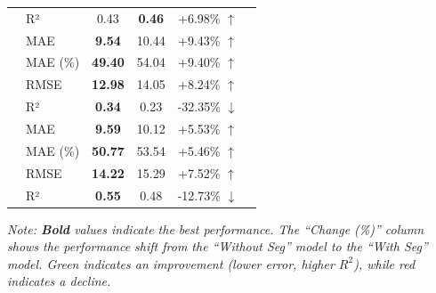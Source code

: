 \documentclass[a4paper]{article}
\begin{document}
\begin{table}[H]
\begin{lrbox}{\mycomparisonboxtable}
\begin{tabular}{@{}llcccc@{}}
            & R²        & 0.43   & \textbf{0.46}   & \textcolor{goodgreen}{+6.98\% $\uparrow$} \\
            \addlinespace
            \multirow{4}{*}{\textbf{Carbs}}    
            & MAE       & \textbf{9.54}   & 10.44  & \textcolor{badred}{+9.43\% $\uparrow$} \\
            & MAE (\%)  & \textbf{49.40}  & 54.04  & \textcolor{badred}{+9.40\% $\uparrow$} \\
            & RMSE      & \textbf{12.98}  & 14.05  & \textcolor{badred}{+8.24\% $\uparrow$} \\
            & R²        & \textbf{0.34}   & 0.23   & \textcolor{badred}{-32.35\% $\downarrow$} \\
            \addlinespace
            \multirow{4}{*}{\textbf{Protein}}  
            & MAE       & \textbf{9.59}   & 10.12  & \textcolor{badred}{+5.53\% $\uparrow$} \\
            & MAE (\%)  & \textbf{50.77}  & 53.54  & \textcolor{badred}{+5.46\% $\uparrow$} \\
            & RMSE      & \textbf{14.22}  & 15.29  & \textcolor{badred}{+7.52\% $\uparrow$} \\
            & R²        & \textbf{0.55}   & 0.48   & \textcolor{badred}{-12.73\% $\downarrow$} \\
            \bottomrule
            \end{tabular}
            \end{lrbox}
            \usebox{\mycomparisonboxtable} %
            \vspace{1ex} %
            \begin{minipage}{\wd\mycomparisonboxtable}
            \small\emph{Note: \textbf{Bold} values indicate the best performance. 
            The ``Change (\%)'' column shows the performance shift from the ``Without Seg'' model to the ``With Seg'' model. 
            \textcolor{goodgreen}{Green indicates an improvement} (lower error, higher $R^2$), 
            while \textcolor{badred}{red indicates a decline}.}
            \end{minipage}
        \end{table}
        
\end{document}
